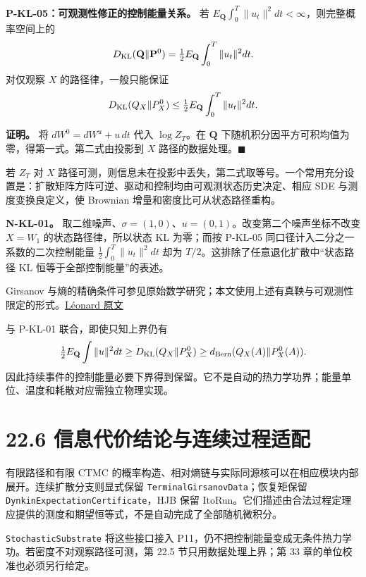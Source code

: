 \documentclass[
  11pt,
  oneside]{book}
\begin{document}
\hypertarget{p-kl-05}{}\label{p-kl-05}

\textbf{P-KL-05：可观测性修正的控制能量关系。} 若 \(E_{\mathbf Q}\int_0^T\|u_t\|^2dt<\infty\)，则完整概率空间上的 \[D_{\rm KL}(\mathbf Q\|\mathbf P^0)
=\tfrac12E_{\mathbf Q}\int_0^T\|u_t\|^2dt.\] 对仅观察 \(X\) 的路径律，一般只能保证 \[D_{\rm KL}(Q_X\|P_X^0)
\le\tfrac12E_{\mathbf Q}\int_0^T\|u_t\|^2dt.\]

\textbf{证明。} 将 \(dW^0=dW^u+u\,dt\) 代入 \(\log Z_T\)。在 \(\mathbf Q\) 下随机积分因平方可积均值为零，得第一式。第二式由投影到 \(X\) 路径的数据处理。\(\blacksquare\)

若 \(Z_T\) 对 \(X\) 路径可测，则信息未在投影中丢失，第二式取等号。一个常用充分设置是：扩散矩阵方阵可逆、驱动和控制均由可观测状态历史决定、相应 SDE 与测度变换良定义，使 Brownian 增量和密度比可从状态路径重构。

\textbf{N-KL-01。} 取二维噪声、\(\sigma=(1,0)\)、\(u=(0,1)\)。改变第二个噪声坐标不改变 \(X=W_1\) 的状态路径律，所以状态 KL 为零；而按 P-KL-05 同口径计入二分之一系数的二次控制能量 \(\tfrac12\int_0^T\|u_t\|^2dt\) 却为 \(T/2\)。这排除了任意退化扩散中``状态路径 KL 恒等于全部控制能量''的表述。

Girsanov 与熵的精确条件可参见原始数学研究；本文使用上述有真鞅与可观测性限定的形式。\href{https://leonard.perso.math.cnrs.fr/papers/2012-Leonard-Girsanov\%20theory\%20under\%20a\%20finite\%20entropy\%20condition.pdf}{Léonard 原文}

与 P-KL-01 联合，即使只知上界仍有 \[\tfrac12E_{\mathbf Q}\int\|u\|^2dt
\ge D_{\rm KL}(Q_X\|P_X^0)
\ge d_{\rm Bern}(Q_X(A)\|P_X^0(A)).\] 因此持续事件的控制能量必要下界得到保留。它不是自动的热力学功界；能量单位、温度和耗散对应需独立物理实现。

\section{22.6 信息代价结论与连续过程适配}\label{ux4fe1ux606fux4ee3ux4ef7ux7ed3ux8bbaux4e0eux8fdeux7eedux8fc7ux7a0bux9002ux914d}

有限路径和有限 CTMC 的概率构造、相对熵链与实际同源核可以在相应模块内部展开。连续扩散分支则显式保留 \nolinkurl{TerminalGirsanovData}；恢复矩保留 \nolinkurl{DynkinExpectationCertificate}，HJB 保留 ItoRun。它们描述由合法过程定理应提供的测度和期望恒等式，不是自动完成了全部随机微积分。

\nolinkurl{StochasticSubstrate} 将这些接口接入 P11，仍不把控制能量变成无条件热力学功。若密度不对观察路径可测，第 22.5 节只用数据处理上界；第 33 章的单位校准也必须另行给定。
\end{document}
